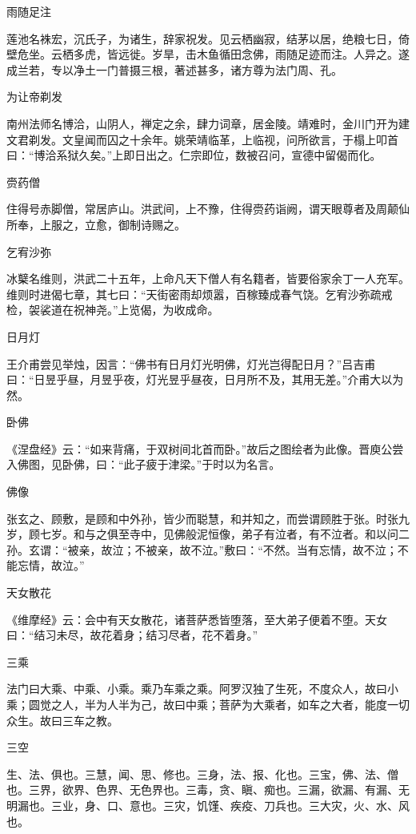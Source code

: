 \documentclass[a4paper,12pt,UTF8,twoside]{ctexbook}
\begin{document}
    雨随足注
    
    莲池名袾宏，沉氏子，为诸生，辞家祝发。见云栖幽寂，结茅以居，绝粮七日，倚壁危坐。云栖多虎，皆远徙。岁旱，击木鱼循田念佛，雨随足迹而注。人异之。遂成兰若，专以净土一门普摄三根，著述甚多，诸方尊为法门周、孔。
    
    为让帝剃发
    
    南州法师名博洽，山阴人，禅定之余，肆力词章，居金陵。靖难时，金川门开为建文君剃发。文皇闻而囚之十余年。姚荣靖临革，上临视，问所欲言，于榻上叩首曰：“博洽系狱久矣。”上即日出之。仁宗即位，数被召问，宣德中留偈而化。
    
    赍药僧
    
    住得号赤脚僧，常居庐山。洪武间，上不豫，住得赍药诣阙，谓天眼尊者及周颠仙所奉，上服之，立愈，御制诗赐之。
    
    乞宥沙弥
    
    冰櫱名维则，洪武二十五年，上命凡天下僧人有名籍者，皆要俗家余丁一人充军。维则时进偈七章，其七曰：“天街密雨却烦嚣，百稼臻成春气饶。乞宥沙弥疏戒检，袈裟道在祝神尧。”上览偈，为收成命。
    
    日月灯
    
    王介甫尝见举烛，因言：“佛书有日月灯光明佛，灯光岂得配日月？”吕吉甫曰：“日昱乎昼，月昱乎夜，灯光昱乎昼夜，日月所不及，其用无差。”介甫大以为然。
    
    卧佛
    
    《涅盘经》云：“如来背痛，于双树间北首而卧。”故后之图绘者为此像。晋庾公尝入佛图，见卧佛，曰：“此子疲于津梁。”于时以为名言。
    
    佛像
    
    张玄之、顾敷，是顾和中外孙，皆少而聪慧，和并知之，而尝谓顾胜于张。时张九岁，顾七岁。和与之俱至寺中，见佛般泥恒像，弟子有泣者，有不泣者。和以问二孙。玄谓：“被亲，故泣；不被亲，故不泣。”敷曰：“不然。当有忘情，故不泣；不能忘情，故泣。”
    
    天女散花
    
    《维摩经》云：会中有天女散花，诸菩萨悉皆堕落，至大弟子便着不堕。天女曰：“结习未尽，故花着身；结习尽者，花不着身。”
    
    三乘
    
    法门曰大乘、中乘、小乘。乘乃车乘之乘。阿罗汉独了生死，不度众人，故曰小乘；圆觉之人，半为人半为己，故曰中乘；菩萨为大乘者，如车之大者，能度一切众生。故曰三车之教。
    
    三空
    
    生、法、俱也。三慧，闻、思、修也。三身，法、报、化也。三宝，佛、法、僧也。三界，欲界、色界、无色界也。三毒，贪、瞋、痴也。三漏，欲漏、有漏、无明漏也。三业，身、口、意也。三灾，饥馑、疾疫、刀兵也。三大灾，火、水、风也。
    
\end{document}
